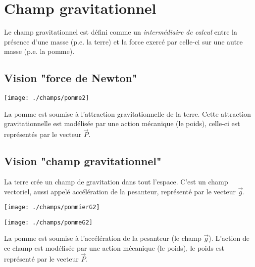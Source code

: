 
\section{Champ gravitationnel}
%
Le champ gravitationnel est défini comme un {\it intermédiaire de calcul} entre la présence d'une masse (p.e. la terre) et la force exercé par celle-ci sur une autre masse (p.e. la pomme).

\subsection{Vision "force de Newton"}

\begin{minipage}[c]{.45\linewidth}
\begin{center}
\texttt{[image: ./champs/pomme2]}
\end{center}
\end{minipage}
\hfill
\begin{minipage}[c]{.45\linewidth}
La pomme est soumise à l'attraction gravitationnelle de la terre. Cette attraction gravitationnelle est modélisée par une action mécanique (le poids), celle-ci est représentés par le vecteur $\overrightarrow{P}$.
\end{minipage}

\vfill
\subsection{Vision "champ gravitationnel"}

\begin{minipage}[c]{.45\linewidth}
La terre crée un champ de gravitation dans tout l'espace. C'est un champ vectoriel, aussi appelé accélération de la pesanteur, représenté par le vecteur $\overrightarrow{g}$.
\end{minipage}
\hfill
\begin{minipage}[c]{.45\linewidth}
\begin{center}
\texttt{[image: ./champs/pommierG2]}
\end{center}
\end{minipage}

\vfill

\begin{minipage}[c]{.45\linewidth}
\begin{center}
\texttt{[image: ./champs/pommeG2]}
\end{center}
\end{minipage}
\hfill
\begin{minipage}[c]{.45\linewidth}
La pomme est soumise à l'accélération de la pesanteur (le champ $\overrightarrow{g}$). L'action de ce champ est modélisée par une action mécanique (le poids), le poids est représenté par le vecteur $\overrightarrow{P}$.
\end{minipage}

\vfill
\newpage


